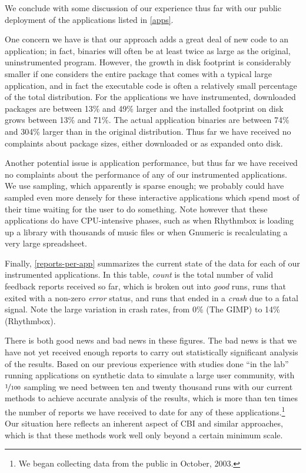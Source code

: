\documentclass[10pt,twocolumn]{article}
\newcommand{\gimp}{The GIMP\xspace}
\newcommand{\gnumeric}{Gnumeric\xspace}
\newcommand{\rhythmbox}{Rhythmbox\xspace}
\begin{document}
We conclude with some discussion of our experience thus far with our public
deployment of the applications listed in \autoref{apps}.

One concern we have is that our approach adds a great deal of new code
to an application; in fact, binaries will often be at least twice as
large as the original, uninstrumented program.  However, the growth in
disk footprint is considerably smaller if one considers the entire
package that comes with a typical large application, and in fact the
executable code is often a relatively small percentage of the total
distribution.  For the applications we have instrumented, downloaded
packages are between 13\% and 49\% larger and the installed footprint
on disk grows between 13\% and 71\%.  The actual application binaries
are between 74\% and 304\% larger than in the original distribution.
Thus far we have received no complaints about package sizes, either
downloaded or as expanded onto disk.

Another potential issue is application performance, but thus far we
have received no complaints about the performance of any of our
instrumented applications.  We use  sampling, which
apparently is sparse enough; we probably could have sampled even more
densely for these interactive applications which spend most of their
time waiting for the user to do something.  Note however that 
these applications do have CPU-intensive phases, such as when
\rhythmbox is loading up a library with thousands of music files or
when \gnumeric is recalculating a very large spreadsheet.

Finally, \autoref{reports-per-app} summarizes the current state of
the data for each of our instrumented applications.  In this table,
\emph{count} is the total number of valid feedback reports received so far,
which is broken out into \emph{good} runs, runs that exited with a
non-zero \emph{error} status, and runs that ended in a \emph{crash} due to a
fatal signal.  Note the large variation in crash rates, from 0\%
(\gimp) to 14\% (\rhythmbox).

There is both good news and bad news in these figures.  The bad news
is that we have not yet received enough reports to carry out
statistically significant analysis of the results.  Based on our
previous experience with studies done ``in the lab'' running
applications on synthetic data to simulate a large user community,
with $\nicefrac{1}{100}$ sampling we need between ten and twenty thousand
runs with our current methods to achieve accurate analysis of
the results, which is more than ten times the number of reports we have
received to date for any of these applications.\footnote{We began
collecting data from the public in October, 2003.}  Our
situation here reflects an inherent aspect of CBI and similar
approaches, which is that these methods work well only beyond a
certain minimum scale.
\end{document}
